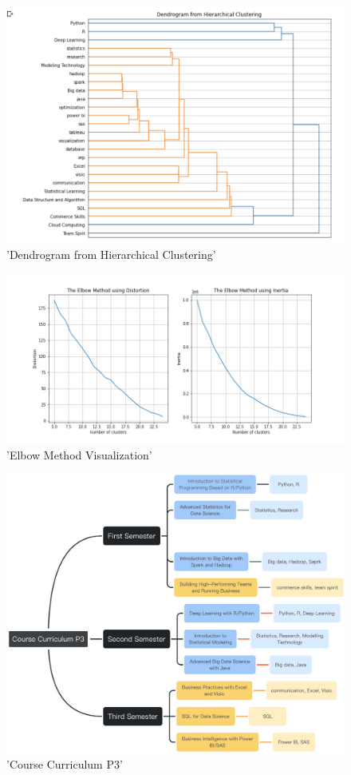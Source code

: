 \documentclass[10pt,onecolumn,letterpaper]{article}
\begin{document}
\begin{figure}[H]
  \centering
  \includegraphics[width=1\textwidth]{f8.png}
  \caption{'Dendrogram from Hierarchical Clustering'}
\end{figure}

\begin{figure}[H]
  \centering
  \includegraphics[width=1\textwidth]{f9.png}
  \caption{'Elbow Method Visualization'}
\end{figure}

\begin{figure}[H]
  \centering
  \includegraphics[width=1\textwidth]{f10.png}
  \caption{'Course Curriculum P3'}
\end{figure}
\end{document}
